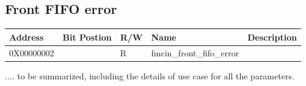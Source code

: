 \documentclass[11pt,letterpaper]{article}
\begin{document}
\subsection {Front FIFO error}

\begin{table}[h!]
\centering
\begin{tabular}{|l|l|l|l|l|}
\hline
Address  & Bit Postion & R/W & Name  & Description \\ \hline
0X00000002           &             & R    & fmcin\_front\_fifo\_error &   \\ \hline
\end{tabular}
\end{table}


.... to be summarized, including the details of use case for all the parameters.
\end{document}
